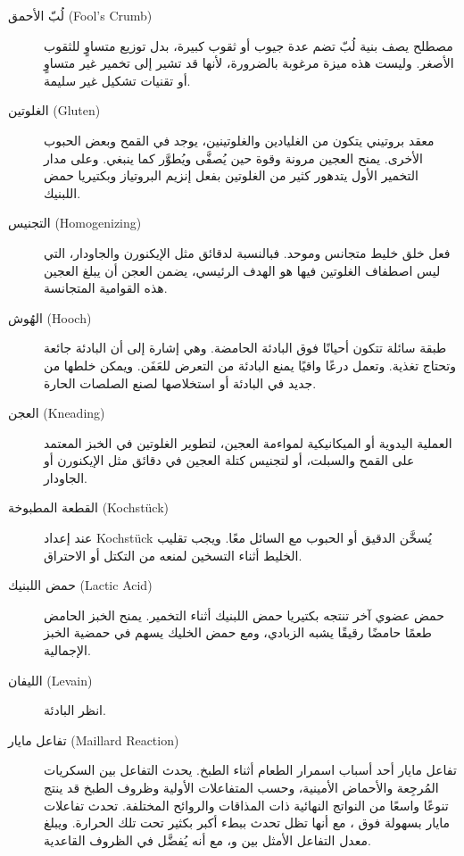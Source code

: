 \begin{description}
\item[لُبّ الأحمق \textenglish{(Fool's Crumb)}]
مصطلح يصف بنية لُبّ تضم عدة جيوب أو ثقوب كبيرة، بدل توزيع متساوٍ للثقوب الأصغر. وليست هذه ميزة مرغوبة بالضرورة، لأنها قد تشير إلى تخمير غير متساوٍ أو تقنيات تشكيل غير سليمة.

\item[الغلوتين \textenglish{(Gluten)}]
معقد بروتيني يتكون من الغليادين والغلوتينين، يوجد في القمح وبعض الحبوب الأخرى. يمنح العجين مرونة وقوة حين يُصفَّى ويُطوَّر كما ينبغي. وعلى مدار التخمير الأول يتدهور كثير من الغلوتين بفعل إنزيم البروتياز وبكتيريا حمض اللبنيك.

\item[التجنيس \textenglish{(Homogenizing)}]
فعل خلق خليط متجانس وموحد. فبالنسبة لدقائق مثل الإيكنورن والجاودار، التي ليس اصطفاف الغلوتين فيها هو الهدف الرئيسي، يضمن العجن أن يبلغ العجين هذه القوامية المتجانسة.

\item[الهُوش \textenglish{(Hooch)}]
طبقة سائلة تتكون أحيانًا فوق البادئة الحامضة. وهي إشارة إلى أن البادئة جائعة وتحتاج تغذية. وتعمل درعًا واقيًا يمنع البادئة من التعرض للعَفَن. ويمكن خلطها من جديد في البادئة أو استخلاصها لصنع الصلصات الحارة.

\item[العجن \textenglish{(Kneading)}]
العملية اليدوية أو الميكانيكية لمواءمة العجين، لتطوير الغلوتين في الخبز المعتمد على القمح والسبلت، أو لتجنيس كتلة العجين في دقائق مثل الإيكنورن أو الجاودار.

\item[القطعة المطبوخة \textenglish{(Kochstück)}]
عند إعداد \textenglish{Kochstück} يُسخَّن الدقيق أو الحبوب مع السائل معًا. ويجب تقليب الخليط أثناء التسخين لمنعه من التكتل أو الاحتراق.

\item[حمض اللبنيك \textenglish{(Lactic Acid)}]
حمض عضوي آخر تنتجه بكتيريا حمض اللبنيك أثناء التخمير. يمنح الخبز الحامض طعمًا حامضًا رقيقًا يشبه الزبادي، ومع حمض الخليك يسهم في حمضية الخبز الإجمالية.

\item[الليفان \textenglish{(Levain)}]
انظر البادئة.

\item[تفاعل مايار \textenglish{(Maillard Reaction)}]
تفاعل مايار أحد أسباب اسمرار الطعام أثناء الطبخ. يحدث التفاعل بين السكريات المُرجِعة والأحماض الأمينية، وحسب المتفاعلات الأولية وظروف الطبخ قد ينتج تنوعًا واسعًا من النواتج النهائية ذات المذاقات والروائح المختلفة. تحدث تفاعلات مايار بسهولة فوق ، مع أنها تظل تحدث ببطء أكبر بكثير تحت تلك الحرارة. ويبلغ معدل التفاعل الأمثل بين  و، مع أنه يُفضَّل في الظروف القاعدية.


\end{description}
